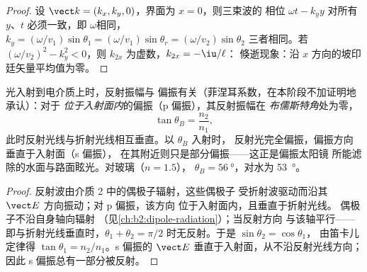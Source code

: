 \begin{proof}
设 $\vect k = (k_x, k_y, 0)$，界面为 $x = 0$，则三束波的
相位 $\omega t - k_yy$ 对所有 $y$、$t$ 必须一致，即
$\omega$相同，$k_y = (\omega/v_1)\sin\theta_1 = (\omega/v_1)\sin\theta_r = (\omega/v_2)\sin
\theta_2$ 三者相同。若 $(\omega/v_2)^2 - k_y^2 < 0$，则 $k_{2x}$ 为虚数，$k_{2x} = -\iu/\ell$：
倏逝现象：沿 $x$ 方向的坡印廷矢量平均值为零。
\end{proof}

\begin{proposition}\label{prop:b2:wave-interfaces:brewster}
光入射到电介质上时，反射振幅与
偏振有关（菲涅耳系数，在本阶段不加证明地承认）：对于
\emph{位于入射面内}的偏振（p 偏振），其反射振幅在
\emph{布儒斯特角}处为零，
\[
\tan\theta_B = \frac{n_2}{n_1} ,
\]
此时反射光线与折射光线相互垂直。以 $\theta_B$ 入射时，
反射光完全偏振，偏振方向垂直于入射面（s 偏振），
在其附近则只是部分偏振——这正是偏振太阳镜
所能滤除的水面与路面眩光。对玻璃（$n = 1.5$），
$\theta_B = \qty{56}{\degree}$，对水为 \qty{53}{\degree}。
\end{proposition}

\begin{proof}
反射波由介质 2 中的偶极子辐射，这些偶极子
受折射波驱动而沿其 $\vect E$ 方向振动；对 p 偏振，该方向
位于入射面内，且垂直于折射光线。
偶极子不沿自身轴向辐射
（见\cref{ch:b2:dipole-radiation}）；当反射方向
与该轴平行——即与折射光线垂直时，$\theta_1
+ \theta_2 = \pi/2$ 时无反射。于是 $\sin\theta_2 = \cos\theta_1$，
由笛卡儿定律得 $\tan\theta_1 = n_2/n_1$。s 偏振的 $\vect E$
垂直于入射面，从不沿反射光线方向；
因此 s 偏振总有一部分被反射。
\end{proof}

